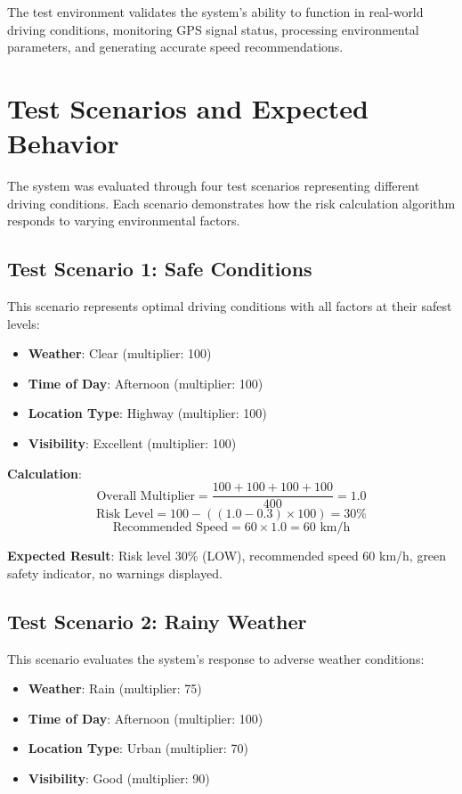 The test environment validates the system's ability to function in real-world driving conditions, monitoring GPS signal status, processing environmental parameters, and generating accurate speed recommendations.

\section{Test Scenarios and Expected Behavior}
The system was evaluated through four test scenarios representing different driving conditions. Each scenario demonstrates how the risk calculation algorithm responds to varying environmental factors.

\subsection{Test Scenario 1: Safe Conditions}
This scenario represents optimal driving conditions with all factors at their safest levels:
\begin{itemize}
    \item \textbf{Weather}: Clear (multiplier: 100)
    \item \textbf{Time of Day}: Afternoon (multiplier: 100)
    \item \textbf{Location Type}: Highway (multiplier: 100)
    \item \textbf{Visibility}: Excellent (multiplier: 100)
\end{itemize}

\textbf{Calculation}:
\begin{equation}
\text{Overall Multiplier} = \frac{100 + 100 + 100 + 100}{400} = 1.0
\end{equation}
\begin{equation}
\text{Risk Level} = 100 - ((1.0 - 0.3) \times 100) = 30\%
\end{equation}
\begin{equation}
\text{Recommended Speed} = 60 \times 1.0 = 60 \text{ km/h}
\end{equation}

\textbf{Expected Result}: Risk level 30\% (LOW), recommended speed 60 km/h, green safety indicator, no warnings displayed.

\subsection{Test Scenario 2: Rainy Weather}
This scenario evaluates the system's response to adverse weather conditions:
\begin{itemize}
    \item \textbf{Weather}: Rain (multiplier: 75)
    \item \textbf{Time of Day}: Afternoon (multiplier: 100)
    \item \textbf{Location Type}: Urban (multiplier: 70)
    \item \textbf{Visibility}: Good (multiplier: 90)
\end{itemize}

